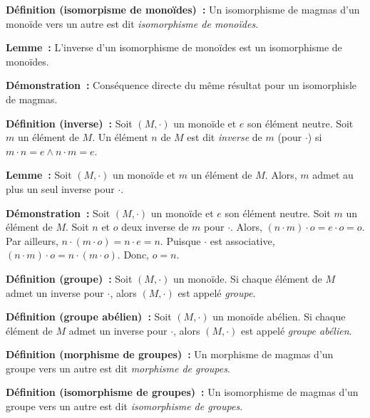 \medskip

\noindent\textbf{Définition (isomorpisme de monoïdes) :} Un isomorphisme de magmas d'un monoïde vers un autre est dit \textit{isomorphisme de monoïdes}.

\medskip

\noindent\textbf{Lemme :} L'inverse d'un isomorphisme de monoïdes est un isomorphisme de monoïdes.

\medskip

\noindent\textbf{Démonstration :} Conséquence directe du même résultat pour un isomorphisle de magmas.

\medskip

\noindent\textbf{Définition (inverse) :} Soit $(M,\cdot)$ un monoïde et $e$ son élément neutre. 
    Soit $m$ un élément de $M$. 
    Un élément $n$ de $M$ est dit \textit{inverse} de $m$ (pour $\cdot$) si $m \cdot n = e \wedge  n \cdot m = e$.
    
\medskip

\noindent\textbf{Lemme :} Soit $(M,\cdot)$ un monoïde et $m$ un élément de $M$.
    Alors, $m$ admet au plus un seul inverse pour $\cdot$.

\medskip

\noindent\textbf{Démonstration :} Soit $(M,\cdot)$ un monoïde et $e$ son élément neutre. 
    Soit $m$ un élément de $M$. 
    Soit $n$ et $o$ deux inverse de $m$ pour $\cdot$. 
    Alors, $(n \cdot m) \cdot o = e \cdot o = o$.
    Par ailleurs, $n \cdot (m \cdot o) = n \cdot e = n$.
    Puisque $\cdot$ est associative, $(n \cdot m) \cdot o = n \cdot (m \cdot o)$. 
    Donc, $o = n$.

    \hfill \square

\medskip

\noindent\textbf{Définition (groupe) :} Soit $(M,\cdot)$ un monoïde. 
    Si chaque élément de $M$ admet un inverse pour $\cdot$, alors $(M,\cdot)$ est appelé \textit{groupe}.

\medskip

\noindent\textbf{Définition (groupe abélien) :} Soit $(M,\cdot)$ un monoïde abélien. 
    Si chaque élément de $M$ admet un inverse pour $\cdot$, alors $(M,\cdot)$ est appelé \textit{groupe abélien}.

\medskip

\noindent\textbf{Définition (morphisme de groupes) :} Un morphisme de magmas d'un groupe vers un autre est dit \textit{morphisme de groupes}.

\medskip

\noindent\textbf{Définition (isomorphisme de groupes) :} Un isomorphisme de magmas d'un groupe vers un autre est dit \textit{isomorphisme de groupes}.

